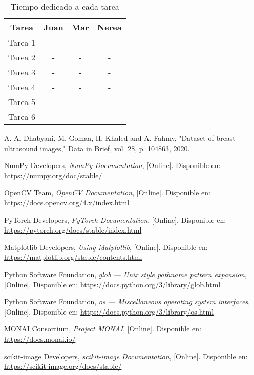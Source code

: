 \documentclass[12pt]{article}
\begin{document}
\begin{table}[H]
\centering
\begin{tabular}{|c|c|c|c|}
\hline
\textbf{Tarea} & \textbf{Juan} & \textbf{Mar} & \textbf{Nerea} \\
\hline
Tarea 1 & - & - & - \\
Tarea 2 & - & - & - \\
Tarea 3 & - & - & - \\
Tarea 4 & - & - & - \\
Tarea 5 & - & - & - \\
Tarea 6 & - & - & - \\
\hline
\end{tabular}
\caption{Tiempo dedicado a cada tarea}
\end{table}

\begin{thebibliography}{9}

A. Al-Dhabyani, M. Gomaa, H. Khaled and A. Fahmy, "Dataset of breast ultrasound images," Data in Brief, vol. 28, p. 104863, 2020.

NumPy Developers, \textit{NumPy Documentation}, [Online]. Disponible en: \url{https://numpy.org/doc/stable/}

OpenCV Team, \textit{OpenCV Documentation}, [Online]. Disponible en: \url{https://docs.opencv.org/4.x/index.html}

PyTorch Developers, \textit{PyTorch Documentation}, [Online]. Disponible en: \url{https://pytorch.org/docs/stable/index.html}

Matplotlib Developers, \textit{Using Matplotlib}, [Online]. Disponible en: \url{https://matplotlib.org/stable/contents.html}

Python Software Foundation, \textit{glob — Unix style pathname pattern expansion}, [Online]. Disponible en: \url{https://docs.python.org/3/library/glob.html}

Python Software Foundation, \textit{os — Miscellaneous operating system interfaces}, [Online]. Disponible en: \url{https://docs.python.org/3/library/os.html}

MONAI Consortium, \textit{Project MONAI}, [Online]. Disponible en: \url{https://docs.monai.io/}

scikit-image Developers, \textit{scikit-image Documentation}, [Online]. Disponible en: \url{https://scikit-image.org/docs/stable/}


\end{thebibliography}
\end{document}

